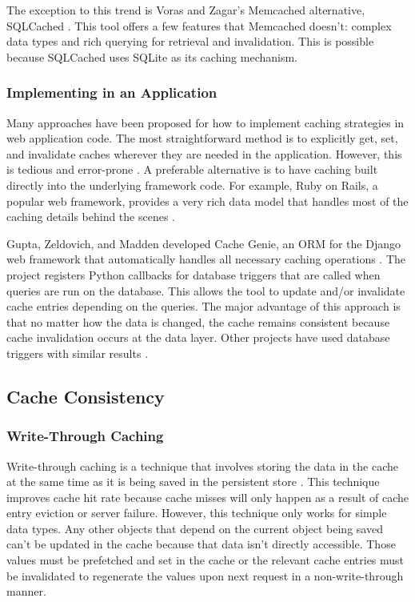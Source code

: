 \documentclass[12pt]{ucthesis}
\begin{document}
The exception to this trend is Voras and Zagar's \textsf{Memcached} alternative, SQLCached \cite{sqlCached}.
This tool offers a few features that \textsf{Memcached} doesn't: complex data types and rich querying for retrieval and invalidation.
This is possible because SQLCached uses SQLite as its caching mechanism.

\subsubsection{Implementing in an Application}
Many approaches have been proposed for how to implement caching strategies in web application code.
The most straightforward method is to explicitly get, set, and invalidate caches wherever they are needed in the application.
However, this is tedious and error-prone \cite{keyBasedCacheExpiration, triggerBasedORM}.
A preferable alternative is to have caching built directly into the underlying framework code.
For example, Ruby on Rails, a popular web framework, provides a very rich data model that handles most of the caching details behind the scenes \cite{keyBasedCacheExpiration}.

Gupta, Zeldovich, and Madden developed Cache Genie, an ORM for the Django web framework that automatically handles all necessary caching operations \cite{triggerBasedORM}.
The project registers Python callbacks for database triggers that are called when queries are run on the database.
This allows the tool to update and/or invalidate cache entries depending on the queries.
The major advantage of this approach is that no matter how the data is changed, the cache remains consistent because cache invalidation occurs at the data layer.
Other projects have used database triggers with similar results \cite{scalableConsistentCaching}.

\subsection{Cache Consistency}
\subsubsection{Write-Through Caching}
Write-through caching is a technique that involves storing the data in the cache at the same time as it is being saved in the persistent store \cite{writeThroughCaching}.
This technique improves cache hit rate because cache misses will only happen as a result of cache entry eviction or server failure.
However, this technique only works for simple data types.
Any other objects that depend on the current object being saved can't be updated in the cache because that data isn't directly accessible.
Those values must be prefetched and set in the cache or the relevant cache entries must be invalidated to regenerate the values upon next request in a non-write-through manner.
\end{document}
